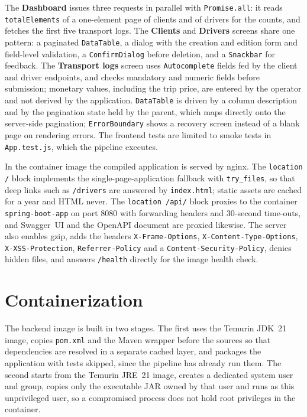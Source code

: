 The \textbf{Dashboard} issues three requests in parallel with \texttt{Promise.all}: it reads \texttt{totalElements} of a one-element page of clients and of drivers for the counts, and fetches the first five transport logs. The \textbf{Clients} and \textbf{Drivers} screens share one pattern: a paginated \texttt{DataTable}, a dialog with the creation and edition form and field-level validation, a \texttt{ConfirmDialog} before deletion, and a \texttt{Snackbar} for feedback. The \textbf{Transport logs} screen uses \texttt{Autocomplete} fields fed by the client and driver endpoints, and checks mandatory and numeric fields before submission; monetary values, including the trip price, are entered by the operator and not derived by the application. \texttt{DataTable} is driven by a column description and by the pagination state held by the parent, which maps directly onto the server-side pagination; \texttt{ErrorBoundary} shows a recovery screen instead of a blank page on rendering errors. The frontend tests are limited to smoke tests in \texttt{App.test.js}, which the pipeline executes.

In the container image the compiled application is served by nginx. The \texttt{location /} block implements the single-page-application fallback with \texttt{try\_files}, so that deep links such as \texttt{/drivers} are answered by \texttt{index.html}; static assets are cached for a year and HTML never. The \texttt{location /api/} block proxies to the container \texttt{spring-boot-app} on port 8080 with forwarding headers and 30-second time-outs, and Swagger~UI and the OpenAPI document are proxied likewise. The server also enables gzip, adds the headers \texttt{X-Frame-Options}, \texttt{X-Content-Type-Options}, \texttt{X-XSS-Protection}, \texttt{Referrer-Policy} and a \texttt{Content-Security-Policy}, denies hidden files, and answers \texttt{/health} directly for the image health check.

\section{Containerization}
\label{sec:impl-docker}

The backend image is built in two stages. The first uses the Temurin JDK~21 image, copies \texttt{pom.xml} and the Maven wrapper before the sources so that dependencies are resolved in a separate cached layer, and packages the application with tests skipped, since the pipeline has already run them. The second starts from the Temurin JRE~21 image, creates a dedicated system user and group, copies only the executable JAR owned by that user and runs as this unprivileged user, so a compromised process does not hold root privileges in the container.

